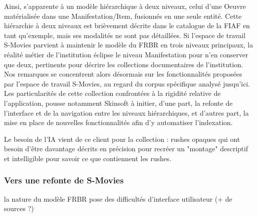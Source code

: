 Ainsi, s'apparente à un modèle hiérarchique à deux niveaux, celui d'une Oeuvre matérialisée dans une Manifestation/Item, fusionnés en une seule entité. Cette hiérarchie à deux niveaux est brièvement décrite dans le catalogue de la FIAF en tant qu'exemple, mais ses modalités ne sont pas détaillées. 
Si l'espace de travail S-Movies parvient à maintenir le modèle du FRBR en trois niveaux principaux, la réalité métier de l'institution éclipse le niveau Manifestation pour n'en conserver que deux, pertinents pour décrire les collections documentaires de l'institution. Nos remarques se concentrent alors désormais sur les fonctionnalités proposées par l'espace de travail S-Movies, au regard du corpus spécifique analysé jusqu'ici. Les particularités de cette collection confrontées à la rigidité relative de l'application, pousse notamment Skinsoft à initier, d'une part, la refonte de l'interface et de la navigation entre les niveaux hiérarchiques, et d'autres part, la mise en place de nouvelles fonctionnalités afin d'y automatiser l'indexation. 


Le besoin de l'IA vient de ce client pour la collection : rushes opaques qui ont besoin d'être davantage décrits en précision pour recréer un "montage" descriptif et intelligible pour savoir ce que contiennent les rushes. 
 


\subsubsection{Vers une refonte de S-Movies}
la nature du modèle FRBR pose des difficultés d'interface utilisateur (+ de sources ?)

